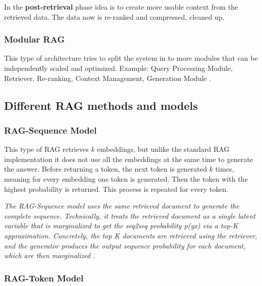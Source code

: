 \documentclass{wseas}
\begin{document}
In the \textbf{post-retrieval} phase idea is to create more usable context 
from the retrieved data. The data now is re-ranked and compressed, cleaned up.

\subsubsection{Modular RAG}

This type of architecture tries to split the system in to more modules
that can be independently scaled and optimized. Example: Query
Processing Module, Retriever, Re-ranking, Context Management, Generation
Module \cite{Retrieval-Augmented_Generation_for_Large_Language_Models:_A_Survey}.

\subsection{Different RAG methods and
models}

\subsubsection{RAG-Sequence Model}

This type of RAG retrieves \(k\) embeddings, but unlike the standard RAG
implementation it does not use all the embeddings at the same time to
generate the answer. Before returning a token, the next token is
generated \(k\) times, meaning for every embedding one token is
generated. Then the token with the highest probability is returned. This 
process is repeated for every token.

\emph{The RAG-Sequence model uses the same retrieved document to
generate the complete sequence. Technically, it treats the retrieved
document as a single latent variable that is marginalized to get the
seq2seq probability p(y\textbar x) via a top-K approximation.
Concretely, the top K documents are retrieved using the retriever, and
the generator produces the output sequence probability for each
document, which are then marginalized} \cite{Retrieval_Augmented_Generation_(RAG)_Explained_Understanding_Key_Concepts}.

\subsubsection{RAG-Token Model}
\end{document}
